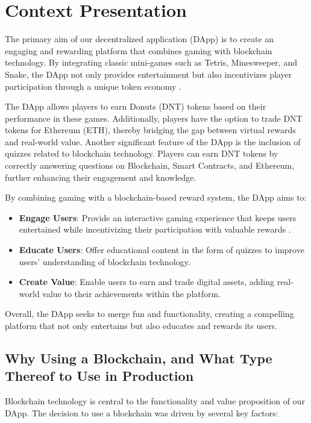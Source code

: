\documentclass[../main.tex]{subfiles}
\begin{document}
\section{Context Presentation}\label{sec:context_presentations}

The primary aim of our decentralized application (DApp) is to create an engaging and rewarding platform that combines gaming with blockchain technology. By integrating classic mini-games such as Tetris, Minesweeper, and Snake, the DApp not only provides entertainment but also incentivizes player participation through a unique token economy \cite{BlockchainGaming2021}.

The DApp allows players to earn Donuts (DNT) tokens based on their performance in these games. Additionally, players have the option to trade DNT tokens for Ethereum (ETH), thereby bridging the gap between virtual rewards and real-world value. Another significant feature of the DApp is the inclusion of quizzes related to blockchain technology. Players can earn DNT tokens by correctly answering questions on Blockchain, Smart Contracts, and Ethereum, further enhancing their engagement and knowledge.

By combining gaming with a blockchain-based reward system, the DApp aims to:
\begin{itemize}
    \item \textbf{Engage Users}: Provide an interactive gaming experience that keeps users entertained while incentivizing their participation with valuable rewards \cite{CointelegraphGaming2022}.
    \item \textbf{Educate Users}: Offer educational content in the form of quizzes to improve users' understanding of blockchain technology.
    \item \textbf{Create Value}: Enable users to earn and trade digital assets, adding real-world value to their achievements within the platform.
\end{itemize}
Overall, the DApp seeks to merge fun and functionality, creating a compelling platform that not only entertains but also educates and rewards its users.

\subsection{Why Using a Blockchain, and What Type Thereof to Use in Production}

Blockchain technology is central to the functionality and value proposition of our DApp. The decision to use a blockchain was driven by several key factors:
\end{document}
